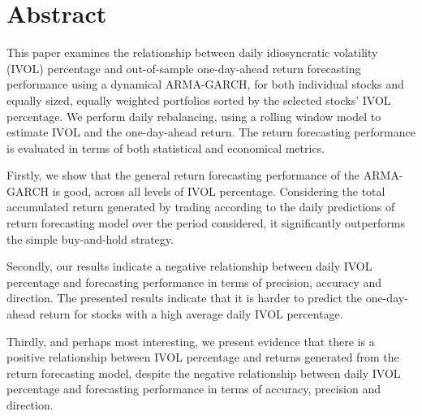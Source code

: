 \chapter{Abstract}
This paper examines the relationship between daily idiosyncratic volatility (IVOL) percentage and out-of-sample one-day-ahead return forecasting performance using a dynamical ARMA-GARCH, for both individual stocks and equally sized, equally weighted portfolios sorted by the selected stocks' IVOL percentage. We perform daily rebalancing, using a rolling window model to estimate IVOL and the one-day-ahead return. The return forecasting performance is evaluated in terms of both statistical and economical metrics.

Firstly, we show that the general return forecasting performance of the ARMA-GARCH is good, across all levels of IVOL percentage. Considering the total accumulated return generated by trading according to the daily predictions of return forecasting model over the period considered, it significantly outperforms the simple buy-and-hold strategy.

Secondly, our results indicate a negative relationship between daily IVOL percentage and forecasting performance in terms of precision, accuracy and direction. The presented results indicate that it is harder to predict the one-day-ahead return for stocks with a high average daily IVOL percentage.

Thirdly, and perhaps most interesting, we present evidence that there is a positive relationship between IVOL percentage and returns generated from the return forecasting model, despite the negative relationship between daily IVOL percentage and forecasting performance in terms of accuracy, precision and direction.

